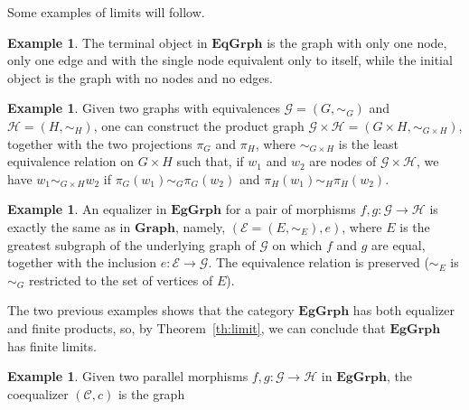 \documentclass[a4paper, twoside,openright]{report}
\theoremstyle{plain}
\theoremstyle{definition}
\newtheorem{definition}[theorem]{Definition}
\newtheorem{example}[theorem]{Example}
\begin{document}

Some examples of limits will follow.

\begin{example}
    The terminal object in $\mathbf{EqGrph}$ is the graph with only one node, only one edge and with the single node equivalent only to itself, while the initial object is the graph with no nodes and no edges.
\end{example}

\begin{example}
    Given two graphs with equivalences $\mathcal{G} = (G, \sim_G) $ and $\mathcal{H} = (H, \sim_{H})$, one can construct the product graph $\mathcal{G \times H} = (G \times H, \sim_{G \times H})$, together with the two projections $\pi_G$ and $\pi_H$,  where $\sim_{G \times H}$ is the least equivalence relation on $G \times H$ such that, if $w_1$ and $w_2$ are nodes of $\mathcal{G \times H}$, we have $w_1 \sim_{G \times H} w_2$ if $\pi_G(w_1) \sim_G \pi_G(w_2)$ and $\pi_H(w_1) \sim_H \pi_H(w_2)$.
\end{example}

\begin{example}
    An equalizer in $\mathbf{EgGrph}$ for a pair of morphisms $f, g: \mathcal{G \rightarrow H}$ is exactly the same as in $\mathbf{Graph}$, namely, $(\mathcal{E} = (E, \sim_E), e)$, where $E$ is the greatest subgraph of the underlying graph of $\mathcal{G}$ on which $f$ and $g$ are equal, together with the inclusion $e: \mathcal{E \rightarrow G}$. The equivalence relation is preserved ($\sim_E$ is $\sim_G$ restricted to the set of vertices of $E$).
\end{example}

The two previous examples shows that the category $\mathbf{EgGrph}$ has both equalizer and finite products, so, by Theorem~\ref{th:limit}, we can conclude that $\mathbf{EgGrph}$ has finite limits.

\begin{example}
    Given two parallel morphisms $f, g: \mathcal{G \rightarrow H}$ in $\mathbf{EgGrph}$, the coequalizer $(\mathcal{C}, c)$ is the graph 
\end{example}



\end{document}
